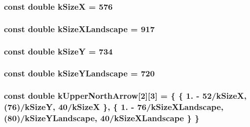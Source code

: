 \hypertarget{a00222_af38ec7276eab5e69e2b8b9b74c7e410d}{
\subsubsection[{k\-Size\-X}]{\setlength{\rightskip}{0pt plus 5cm}const double k\-Size\-X = 576\hspace{0.3cm}{\ttfamily [static]}}}\label{a00222_af38ec7276eab5e69e2b8b9b74c7e410d}
\hypertarget{a00222_a6a5b0e2bab47c3fb6da928006951ed06}{
\subsubsection[{k\-Size\-X\-Landscape}]{\setlength{\rightskip}{0pt plus 5cm}const double k\-Size\-X\-Landscape = 917\hspace{0.3cm}{\ttfamily [static]}}}\label{a00222_a6a5b0e2bab47c3fb6da928006951ed06}
\hypertarget{a00222_a96b810fae104880234d8c31ca2b86416}{
\subsubsection[{k\-Size\-Y}]{\setlength{\rightskip}{0pt plus 5cm}const double k\-Size\-Y = 734\hspace{0.3cm}{\ttfamily [static]}}}\label{a00222_a96b810fae104880234d8c31ca2b86416}
\hypertarget{a00222_a2874803a217d546e2cc3fe8647bc8506}{
\subsubsection[{k\-Size\-Y\-Landscape}]{\setlength{\rightskip}{0pt plus 5cm}const double k\-Size\-Y\-Landscape = 720\hspace{0.3cm}{\ttfamily [static]}}}\label{a00222_a2874803a217d546e2cc3fe8647bc8506}
\hypertarget{a00222_a970471f971903377e8747f8fa2e542c6}{
\subsubsection[{k\-Upper\-North\-Arrow}]{\setlength{\rightskip}{0pt plus 5cm}const double k\-Upper\-North\-Arrow\mbox{[}2\mbox{]}\mbox{[}3\mbox{]} = \{ \{ 1. -\/ 52/{\bf k\-Size\-X}, (76)/{\bf k\-Size\-Y}, 40/{\bf k\-Size\-X} \}, \{ 1. -\/ 76/{\bf k\-Size\-X\-Landscape}, (80)/{\bf k\-Size\-Y\-Landscape}, 40/{\bf k\-Size\-X\-Landscape} \} \}\hspace{0.3cm}{\ttfamily [static]}}}\label{a00222_a970471f971903377e8747f8fa2e542c6}
